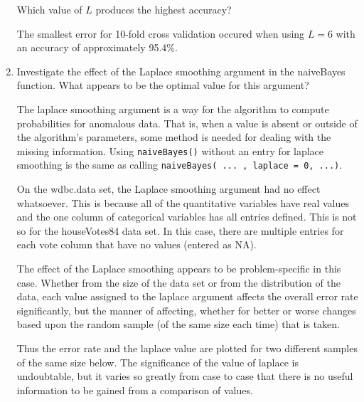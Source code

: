 \documentclass[11pt]{article}
\begin{document}
\begin{enumerate}
\begin{enumerate}
  \end{enumerate}

Which value of $L$ produces the highest accuracy? 

The smallest error for 10-fold cross validation occured when using $L = 6$
with an accuracy of approximately 95.4\%.

\item Investigate the effect of the Laplace smoothing argument in the naiveBayes function. 
What appears to be the optimal value for this argument? 

The laplace smoothing argument is a way for the algorithm to compute probabilities for anomalous data. 
That is, when a value is absent or outside of the algorithm's parameters, some method is needed for 
dealing with the missing information. Using \verb|naiveBayes()| without an entry for laplace smoothing is 
the same as calling \verb|naiveBayes( ... , laplace = 0, ...)|. 

On the wdbc.data set, the Laplace smoothing argument had no effect whatsoever. This is 
because all of the quantitative variables have real values and the one column of 
categorical variables has all entries defined. This is not so for the houseVotes84 data set. 
In this case, there are multiple entries for each vote column that have no values (entered as NA). 

The effect of the Laplace smoothing appears to be problem-specific in this case. Whether from the size of 
the data set or from the distribution of the data, each value assigned to the laplace argument affects the 
overall error rate significantly, but the manner of affecting, whether for better or worse changes 
based upon the random sample (of the same size each time) that is taken. 

Thus the error rate and the laplace value are plotted for two different samples of the same size below. 
The significance of the value of laplace is undoubtable, but it varies so greatly from case to case that 
there is no useful information to be gained from a comparison of values. 


\end{enumerate}
\end{document}
